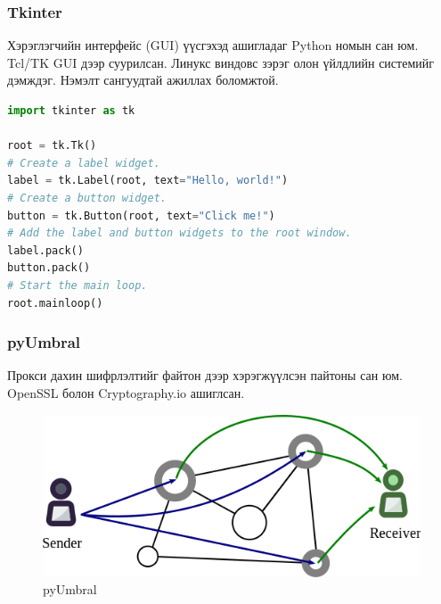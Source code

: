 \subsubsection*{\textbf{Tkinter}}
Хэрэглэгчийн интерфейс (GUI) үүсгэхэд ашигладаг Python номын сан юм. Tcl/TK GUI дээр суурилсан. Линукс виндовс зэрэг олон үйлдлийн системийг дэмждэг. Нэмэлт сангуудтай ажиллах боломжтой.
\begin{lstlisting}[language=Python, caption={Энгийн цонх үүсгэж буй код}]
import tkinter as tk

root = tk.Tk()
# Create a label widget.
label = tk.Label(root, text="Hello, world!")
# Create a button widget.
button = tk.Button(root, text="Click me!")
# Add the label and button widgets to the root window.
label.pack()
button.pack()
# Start the main loop.
root.mainloop()
\end{lstlisting}
\subsubsection*{\textbf{pyUmbral}}
Прокси дахин шифрлэлтийг файтон дээр хэрэгжүүлсэн пайтоны сан юм. OpenSSL болон Cryptography.io ашиглсан.
\begin{figure}[ht]
    \centering
    \includegraphics[scale=0.5]{Figures/umbral.png}
    \caption[pyUmbral]{pyUmbral}
    \label{fig:pyUmbral}
\end{figure}

